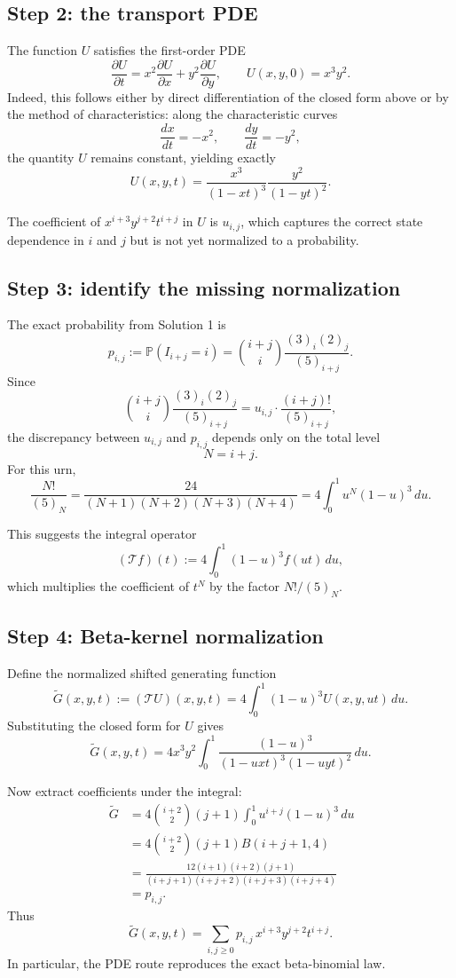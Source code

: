 \documentclass[12pt]{article}
\begin{document}
\subsection*{Step 2: the transport PDE}
The function $U$ satisfies the first-order PDE
\[
\frac{\partial U}{\partial t}
=
x^2\frac{\partial U}{\partial x}
+
y^2\frac{\partial U}{\partial y},
\qquad
U(x,y,0)=x^3y^2.
\]
Indeed, this follows either by direct differentiation of the closed form above or by the method of characteristics: along the characteristic curves
\[
\frac{dx}{dt}=-x^2,\qquad \frac{dy}{dt}=-y^2,
\]
the quantity $U$ remains constant, yielding exactly
\[
U(x,y,t)=\frac{x^3}{(1-xt)^3}\frac{y^2}{(1-yt)^2}.
\]

The coefficient of $x^{i+3}y^{j+2}t^{i+j}$ in $U$ is $u_{i,j}$, which captures the correct state dependence in $i$ and $j$ but is not yet normalized to a probability.

\subsection*{Step 3: identify the missing normalization}
The exact probability from Solution 1 is
\[
p_{i,j}:=\mathbb{P}(I_{i+j}=i)
=
\binom{i+j}{i}\frac{(3)_i(2)_j}{(5)_{i+j}}.
\]
Since
\[
\binom{i+j}{i}\frac{(3)_i(2)_j}{(5)_{i+j}}
=
u_{i,j}\cdot \frac{(i+j)!}{(5)_{i+j}},
\]
the discrepancy between $u_{i,j}$ and $p_{i,j}$ depends only on the total level
\[
N=i+j.
\]
For this urn,
\[
\frac{N!}{(5)_N}
=
\frac{24}{(N+1)(N+2)(N+3)(N+4)}
=
4\int_0^1 u^N(1-u)^3\,du.
\]

This suggests the integral operator
\[
(\mathcal T f)(t):=4\int_0^1 (1-u)^3 f(ut)\,du,
\]
which multiplies the coefficient of $t^N$ by the factor $N!/(5)_N$.

\subsection*{Step 4: Beta-kernel normalization}
Define the normalized shifted generating function
\[
\widetilde G(x,y,t):=(\mathcal T U)(x,y,t)
=
4\int_0^1 (1-u)^3 U(x,y,ut)\,du.
\]
Substituting the closed form for $U$ gives
\[
\widetilde G(x,y,t)
=
4x^3y^2
\int_0^1
\frac{(1-u)^3}{(1-uxt)^3(1-uyt)^2}\,du.
\]

Now extract coefficients under the integral:
\begin{align*}
[x^{i+3}y^{j+2}t^{i+j}]\,\widetilde G
&=
4\binom{i+2}{2}(j+1)\int_0^1 u^{i+j}(1-u)^3\,du \\
&=
4\binom{i+2}{2}(j+1)B(i+j+1,4) \\
&=
\frac{12(i+1)(i+2)(j+1)}{(i+j+1)(i+j+2)(i+j+3)(i+j+4)} \\
&=
p_{i,j}.
\end{align*}
Thus
\[
\widetilde G(x,y,t)
=
\sum_{i,j\ge 0} p_{i,j}\,x^{i+3}y^{j+2}t^{i+j}.
\]
In particular, the PDE route reproduces the exact beta-binomial law.
\end{document}

